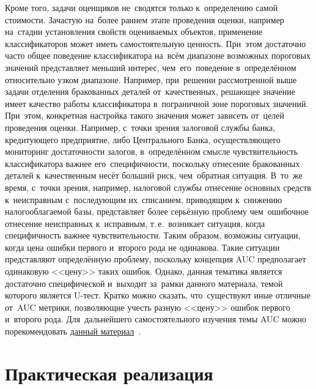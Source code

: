 \documentclass[]{scrreprt}
\begin{document}
Кроме того, задачи оценщиков не~сводятся только к~определению самой стоимости. Зачастую на~более раннем этапе проведения оценки, например на~стадии установления свойств оцениваемых объектов, применение классификаторов может иметь самостоятельную ценность. При~этом достаточно часто общее поведение классификатора на~всём диапазоне возможных пороговых значений представляет меньший интерес, чем~его~поведение в~определённом относительно узком диапазоне. Например, при~решении рассмотренной выше задачи отделения бракованных деталей от~качественных, решающее значение имеет качество работы классификатора в~пограничной зоне пороговых значений. При~этом, конкретная настройка такого значения может зависеть от~целей проведения оценки. Например, с~точки зрения залоговой службы банка, кредитующего предприятие, либо Центрального Банка, осуществляющего мониторинг достаточности залогов, в~определённом смысле чувствительность классификатора важнее его~специфичности, поскольку отнесение бракованных деталей к~качественным несёт больший риск, чем~обратная ситуация. В~то~же время, с~точки зрения, например, налоговой службы отнесение основных средств к~неисправным с~последующим их~списанием, приводящим к~снижению налогооблагаемой базы, представляет более серьёзную проблему чем~ошибочное отнесение неисправных к~исправным, т.\,е.~возникает ситуация, когда специфичность важнее чувствительности. Таким образом, возможны ситуации, когда цена ошибки первого и~второго рода не одинакова. Такие ситуации представляют определённую проблему, поскольку концепция AUC предполагает одинаковую <<цену>> таких ошибок. Однако, данная тематика является достаточно специфической и~выходит за~рамки данного материала, темой которого является U-тест. Кратко можно сказать, что~существуют иные отличные от~AUC метрики, позволяющие учесть разную <<цену>> ошибок первого и~второго рода. Для~дальнейшего самостоятельного изучения темы AUC можно порекомендовать \href{http://nicolas.kruchten.com/content/2016/01/ml-meets-economics/}{данный материал}~\cite{ML-meets-economics}.
 
\chapter{Практическая реализация}\label{U-test-practice}
\end{document}

